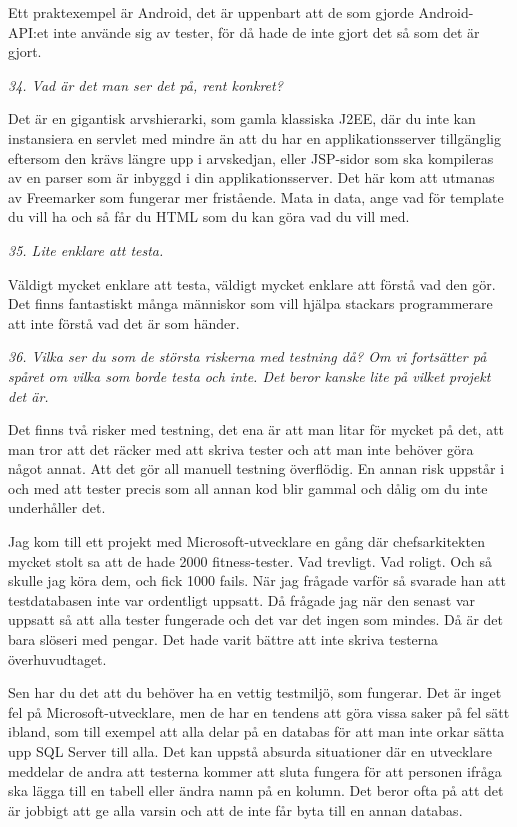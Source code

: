 \documentclass[11pt]{article}
\begin{document}
Ett praktexempel är Android, det är uppenbart att de som gjorde Android-API:et inte använde sig av tester, för då hade de inte gjort det så som det är gjort.

\emph{34. Vad är det man ser det på, rent konkret?}

Det är en gigantisk arvshierarki, som gamla klassiska J2EE, där du inte kan instansiera en servlet med mindre än att du har en applikationsserver tillgänglig eftersom den krävs längre upp i arvskedjan, eller JSP-sidor som ska kompileras av en parser som är inbyggd i din applikationsserver. Det här kom att utmanas av Freemarker som fungerar mer fristående. Mata in data, ange vad för template du vill ha och så får du HTML som du kan göra vad du vill med.

\emph{35. Lite enklare att testa.}

Väldigt mycket enklare att testa, väldigt mycket enklare att förstå vad den gör. Det finns fantastiskt många människor som vill hjälpa stackars programmerare att inte förstå vad det är som händer.

\emph{36. Vilka ser du som de största riskerna med testning då? Om vi fortsätter på spåret om vilka som borde testa och inte. Det beror kanske lite på vilket projekt det är.}

Det finns två risker med testning, det ena är att man litar för mycket på det, att man tror att det räcker med att skriva tester och att man inte behöver göra något annat. Att det gör all manuell testning överflödig. En annan risk uppstår i och med att tester precis som all annan kod blir gammal och dålig om du inte underhåller det.

Jag kom till ett projekt med Microsoft-utvecklare en gång där chefsarkitekten mycket stolt sa att de hade 2000 fitness-tester. Vad trevligt. Vad roligt. Och så skulle jag köra dem, och fick 1000 fails. När jag frågade varför så svarade han att testdatabasen inte var ordentligt uppsatt. Då frågade jag när den senast var uppsatt så att alla tester fungerade och det var det ingen som mindes. Då är det bara slöseri med pengar. Det hade varit bättre att inte skriva testerna överhuvudtaget.

Sen har du det att du behöver ha en vettig testmiljö, som fungerar. Det är inget fel på Microsoft-utvecklare, men de har en tendens att göra vissa saker på fel sätt ibland, som till exempel att alla delar på en databas för att man inte orkar sätta upp SQL Server till alla. Det kan uppstå absurda situationer där en utvecklare meddelar de andra att testerna kommer att sluta fungera för att personen ifråga ska lägga till en tabell eller ändra namn på en kolumn. Det beror ofta på att det är jobbigt att ge alla varsin och att de inte får byta till en annan databas.
\end{document}
